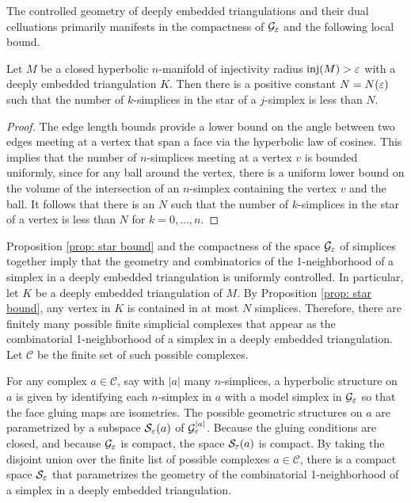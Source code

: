 The controlled geometry of deeply embedded triangulations and their dual celluations primarily manifests in the compactness of $\mathcal G_\varepsilon$ and the following local bound.

\begin{prop} \label{prop: star bound}Let $M$ be a closed hyperbolic $n$-manifold of injectivity radius $\operatorname{inj}(M)>\varepsilon$ with a deeply embedded triangulation $K$. Then there is a positive constant $N = N(\varepsilon)$ such that the number of $k$-simplices in the star of a $j$-simplex is less than $N$.
\end{prop}

\begin{proof}

The edge length bounds provide a lower bound on the angle between two edges meeting at a vertex that span a face via the hyperbolic law of cosines. This implies that the number of $n$-simplices meeting at a vertex $v$ is bounded uniformly, since for any ball around the vertex, there is a uniform lower bound on the volume of the intersection of an $n$-simplex containing the vertex $v$ and the ball. It follows that there is an $N$ such that the number of $k$-simplices in the star of a vertex is less than $N$ for $k = 0,\dots, n$.\end{proof}


Proposition \ref{prop: star bound} and the compactness of the space $\mathcal G_\varepsilon$ of simplices together imply that the geometry and combinatorics of the 1-neighborhood of a simplex in a deeply embedded triangulation is uniformly controlled.
In particular, let $K$ be a deeply embedded triangulation of $M$. By Proposition \ref{prop: star bound}, any vertex in $K$ is contained in at most $N$ simplices. Therefore, there are finitely many possible finite simplicial complexes that appear as the combinatorial 1-neighborhood of a simplex in a deeply embedded triangulation. Let $\mathcal C$ be the finite set of such possible complexes.

For any complex $a \in \mathcal C$, say with $|a|$ many $n$-simplices, a hyperbolic structure on $a$ is given by identifying each $n$-simplex in $a$ with a model simplex in $\mathcal G_{\varepsilon}$ so that the face gluing maps are isometries. The possible geometric structures on $a$ are parametrized by a subspace $\mathcal S_\varepsilon(a)$ of $\mathcal G_{\varepsilon}^{|a|}$. Because the gluing conditions are closed, and because $\mathcal G_\varepsilon$ is compact, the space $\mathcal S_\varepsilon(a)$ is compact.
By taking the disjoint union over the finite list of possible complexes $a\in\mathcal C$, there is a compact space $\mathcal S_{\varepsilon}$ that parametrizes the geometry of the combinatorial 1-neighborhood of a simplex in a deeply embedded triangulation.

